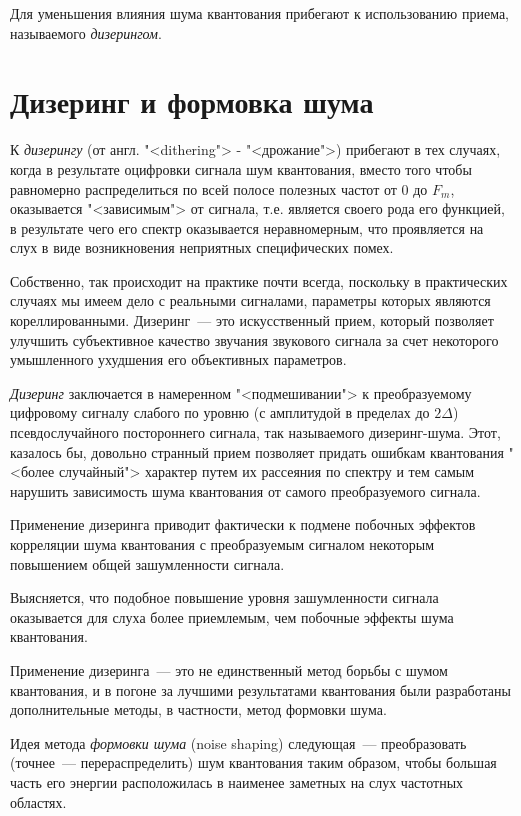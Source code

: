 \documentclass[oneside, final, 14pt]{extreport}
\begin{document}
Для уменьшения влияния шума квантования прибегают к использованию приема, называемого \textit{дизерингом}.

\section{Дизеринг и формовка шума}
К \textit{дизерингу} (от англ. "<dithering"> - "<дрожание">) прибегают в тех случаях, когда в результате оцифровки сигнала шум квантования, вместо того чтобы равномерно распределиться по всей полосе полезных частот от 0 до $F_m$, оказывается "<зависимым"> от сигнала, т.е. является своего рода его функцией, в результате чего его спектр оказывается неравномерным, что проявляется на слух в виде возникновения неприятных специфических помех. 

Собственно, так происходит на практике почти всегда, поскольку в практических случаях мы имеем дело с реальными сигналами, параметры которых являются кореллированными. Дизеринг~--- это искусственный прием, который позволяет улучшить субъективное качество звучания
звукового сигнала за счет некоторого умышленного ухудшения его объективных параметров.

\textit{Дизеринг} заключается в намеренном "<подмешивании"> к преобразуемому цифровому сигналу слабого по уровню (с амплитудой в пределах до $2\Delta$) псевдослучайного постороннего сигнала, так называемого дизеринг-шума. Этот, казалось бы, довольно странный прием позволяет придать ошибкам квантования "<более случайный"> характер путем их рассеяния по спектру и тем самым нарушить зависимость
шума квантования от самого преобразуемого сигнала. 

Применение дизеринга приводит фактически к подмене побочных эффектов корреляции шума квантования с преобразуемым сигналом некоторым повышением общей зашумленности сигнала.

Выясняется, что подобное повышение уровня зашумленности сигнала оказывается для слуха более приемлемым, чем побочные эффекты шума квантования.

Применение дизеринга~--- это не единственный метод борьбы с шумом квантования, и в погоне за лучшими результатами квантования были разработаны дополнительные методы, в частности, метод формовки шума.

Идея метода \textit{формовки шума} (noise shaping) следующая~--- преобразовать (точнее~--- перераспределить) шум квантования таким образом, чтобы большая часть его энергии расположилась в наименее заметных на слух частотных областях. 
\end{document}
